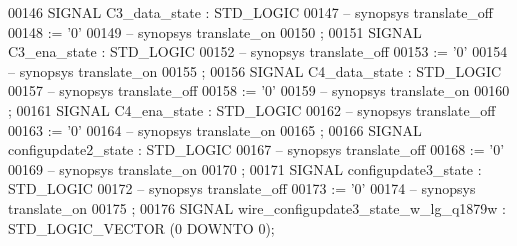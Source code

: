 \begin{DoxyCode}
{00146      \textcolor{keywordflow}{SIGNAL}  \textcolor{vhdlchar}{C3_data_state}  \textcolor{vhdlchar}{:}   \textcolor{comment}{STD\_LOGIC}
00147 \textcolor{keyword}{     -- synopsys translate\_off}
00148       \textcolor{vhdlchar}{:=} \textcolor{vhdlchar}{'}\textcolor{vhdllogic}{}\textcolor{vhdllogic}{0}\textcolor{vhdlchar}{'}
00149 \textcolor{keyword}{     -- synopsys translate\_on}
00150      ;
00151      \textcolor{keywordflow}{SIGNAL}  \textcolor{vhdlchar}{C3_ena_state}   \textcolor{vhdlchar}{:}   \textcolor{comment}{STD\_LOGIC}
00152 \textcolor{keyword}{     -- synopsys translate\_off}
00153       \textcolor{vhdlchar}{:=} \textcolor{vhdlchar}{'}\textcolor{vhdllogic}{}\textcolor{vhdllogic}{0}\textcolor{vhdlchar}{'}
00154 \textcolor{keyword}{     -- synopsys translate\_on}
00155      ;
00156      \textcolor{keywordflow}{SIGNAL}  \textcolor{vhdlchar}{C4_data_state}  \textcolor{vhdlchar}{:}   \textcolor{comment}{STD\_LOGIC}
00157 \textcolor{keyword}{     -- synopsys translate\_off}
00158       \textcolor{vhdlchar}{:=} \textcolor{vhdlchar}{'}\textcolor{vhdllogic}{}\textcolor{vhdllogic}{0}\textcolor{vhdlchar}{'}
00159 \textcolor{keyword}{     -- synopsys translate\_on}
00160      ;
00161      \textcolor{keywordflow}{SIGNAL}  \textcolor{vhdlchar}{C4_ena_state}   \textcolor{vhdlchar}{:}   \textcolor{comment}{STD\_LOGIC}
00162 \textcolor{keyword}{     -- synopsys translate\_off}
00163       \textcolor{vhdlchar}{:=} \textcolor{vhdlchar}{'}\textcolor{vhdllogic}{}\textcolor{vhdllogic}{0}\textcolor{vhdlchar}{'}
00164 \textcolor{keyword}{     -- synopsys translate\_on}
00165      ;
00166      \textcolor{keywordflow}{SIGNAL}  \textcolor{vhdlchar}{configupdate2_state}    \textcolor{vhdlchar}{:}   \textcolor{comment}{STD\_LOGIC}
00167 \textcolor{keyword}{     -- synopsys translate\_off}
00168       \textcolor{vhdlchar}{:=} \textcolor{vhdlchar}{'}\textcolor{vhdllogic}{}\textcolor{vhdllogic}{0}\textcolor{vhdlchar}{'}
00169 \textcolor{keyword}{     -- synopsys translate\_on}
00170      ;
00171      \textcolor{keywordflow}{SIGNAL}  \textcolor{vhdlchar}{configupdate3_state}    \textcolor{vhdlchar}{:}   \textcolor{comment}{STD\_LOGIC}
00172 \textcolor{keyword}{     -- synopsys translate\_off}
00173       \textcolor{vhdlchar}{:=} \textcolor{vhdlchar}{'}\textcolor{vhdllogic}{}\textcolor{vhdllogic}{0}\textcolor{vhdlchar}{'}
00174 \textcolor{keyword}{     -- synopsys translate\_on}
00175      ;
00176      \textcolor{keywordflow}{SIGNAL}  \textcolor{vhdlchar}{wire_configupdate3_state_w_lg_q1879w}   \textcolor{vhdlchar}{:}   \textcolor{comment}{STD\_LOGIC\_VECTOR} \textcolor{vhdlchar}{(}\textcolor{vhdllogic}{}\textcolor{vhdllogic}{0} \textcolor{keywordflow}{DOWNTO} \textcolor{vhdllogic}{}\textcolor{vhdllogic}{0}\textcolor{vhdlchar}{)};
}
\end{DoxyCode}
